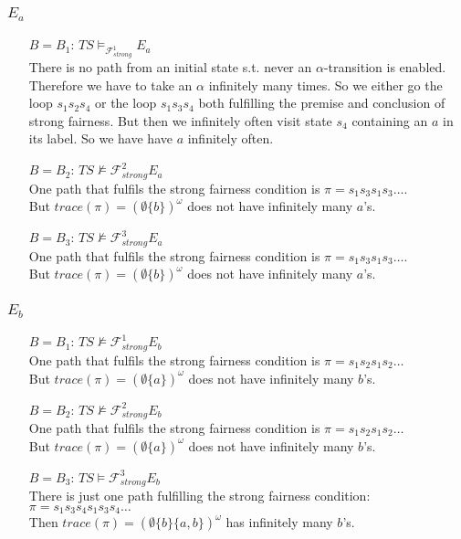 \documentclass[11pt]{article}
\begin{document}
\subsubsection{$E_a$}\label{here}
\begin{itemize}
	\item[$B=B_1$:] $TS \models_{\mathcal{F}_{strong}^1} E_a$\\
		There is no path from an initial state s.t. never an $\alpha$-transition is enabled.
		Therefore we have to take an $\alpha$ infinitely many times. So we either go the loop $s_1s_2s_4$ or the loop $s_1s_3s_4$ both fulfilling the premise and conclusion of strong fairness. But then we infinitely often visit state $s_4$ containing an $a$ in its label. So we have have $a$ infinitely often.
	\item[$B=B_2$:] $TS \not\models{\mathcal{F}_{strong}^2} E_a$\\
	One path that fulfils the strong fairness condition is $\pi = s_1 s_3 s_1 s_3\dots$.\\
	But $trace(\pi) = (\emptyset\{b\})^\omega$ does not have infinitely many $a$'s.
	\item[$B=B_3$:] $TS \not\models{\mathcal{F}_{strong}^3} E_a$\\
	One path that fulfils the strong fairness condition is $\pi = s_1 s_3 s_1 s_3\dots$.\\
	But $trace(\pi) = (\emptyset\{b\})^\omega$ does not have infinitely many $a$'s.
\end{itemize}

\subsubsection{$E_b$}
\begin{itemize}
	\item[$B=B_1$:] $TS \not\models{\mathcal{F}_{strong}^1} E_b$\\
	One path that fulfils the strong fairness condition is $\pi = s_1s_2s_1s_2\dots$\\
	But $trace(\pi) = (\emptyset\{a\})^\omega$ does not have infinitely many $b$'s.
	\item[$B=B_2$:] $TS \not\models{\mathcal{F}_{strong}^2} E_b$\\
	One path that fulfils the strong fairness condition is $\pi = s_1s_2s_1s_2\dots$\\
	But $trace(\pi) = (\emptyset\{a\})^\omega$ does not have infinitely many $b$'s.
	\item[$B=B_3$:] $TS \models{\mathcal{F}_{strong}^3} E_b$\\
	There is just one path fulfilling the strong fairness condition: $\pi= s_1 s_3 s_4 s_1 s_3 s_4 \dots$\\
	Then $trace(\pi) = (\emptyset\{b\}\{a,b\})^\omega$ has infinitely many $b$'s.
\end{itemize}
\end{document}
